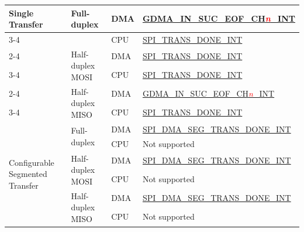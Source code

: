 \documentclass[main\_\_EN.tex]{subfiles}
\begin{document}
\begin{ThreePartTable}
\begin{longtable}[c]{|l|l|l|l|}
\multirow{6}{*}{Single Transfer} & \multirow{2}{*}{Full-duplex} & DMA & \hyperref[int:GDMAINSUCEOFINT]{GDMA\_IN\_SUC\_EOF\_CH\textcolor{red}{\it{n}}\_INT} \tnote{1} \\ \cline{3-4}
&& CPU & \hyperref[int:SPITRANSDONEINT]{SPI\_TRANS\_DONE\_INT} \tnote{2}  \\ \cline{2-4}
& \multirow{2}{*}{Half-duplex MOSI} & DMA & \hyperref[int:SPITRANSDONEINT]{SPI\_TRANS\_DONE\_INT} \\ \cline{3-4}
&& CPU & \hyperref[int:SPITRANSDONEINT]{SPI\_TRANS\_DONE\_INT}  \\ \cline{2-4}
& \multirow{2}{*}{Half-duplex MISO} & DMA & \hyperref[int:GDMAINSUCEOFINT]{GDMA\_IN\_SUC\_EOF\_CH\textcolor{red}{\it{n}}\_INT} \\ \cline{3-4}
&& CPU & \hyperref[int:SPITRANSDONEINT]{SPI\_TRANS\_DONE\_INT} \\ \hline
\multirow{6}{*}{Configurable Segmented Transfer} & \multirow{2}{*}{Full-duplex} & DMA & \hyperref[int:SPIDMASEGTRANSDONEINT]{SPI\_DMA\_SEG\_TRANS\_DONE\_INT} \tnote{3} \\ \cline{3-4}
&& CPU & Not supported       \\ \cline{2-4}
& \multirow{2}{*}{Half-duplex MOSI} & DMA  & \hyperref[int:SPIDMASEGTRANSDONEINT]{SPI\_DMA\_SEG\_TRANS\_DONE\_INT} \\ \cline{3-4}
&& CPU           & Not supported       \\ \cline{2-4}
& \multirow{2}{*}{Half-duplex MISO} & DMA & \hyperref[int:SPIDMASEGTRANSDONEINT]{SPI\_DMA\_SEG\_TRANS\_DONE\_INT} \\ \cline{3-4}
&& CPU & Not supported       \\ \hline
\end{longtable}

\end{ThreePartTable}
\end{document}
